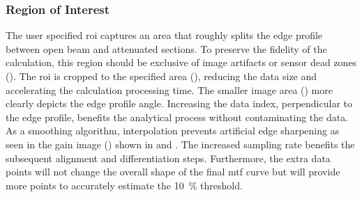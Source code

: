 \documentclass[../../../../main.tex]{subfiles}
\begin{document}
%
    \subsubsection{Region of Interest}%
    \label{app:image-processing:modulation-transfer-function:analytical-methods:region-of-interest}%
    The user specified \gls{roi} captures an area that roughly splits the edge profile between open beam and attenuated sections.
    To preserve the fidelity of the calculation, this region should be exclusive of image artifacts or sensor dead zones ().
    The \gls{roi} is cropped to the specified area (), reducing the data size and accelerating the calculation processing time. 
    The smaller image area () more clearly depicts the edge profile angle.
    Increasing the data index, perpendicular to the edge profile, benefits the analytical process without contaminating the data.
    As a smoothing algorithm, interpolation prevents artificial edge sharpening as seen in the \Xmath{10\times} gain image () shown in  and .
    The increased sampling rate benefits the subsequent alignment and differentiation steps.
    Furthermore, the extra data points will not change the overall shape of the final \gls{mtf} curve but will provide more points to accurately estimate the \SI{10}{\percent} threshold.
\end{document}

